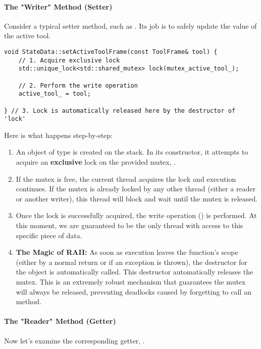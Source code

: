 \paragraph{The "Writer" Method (Setter)}
Consider a typical setter method, such as . Its job is to safely update the value of the active tool.

\begin{verbatim}
void StateData::setActiveToolFrame(const ToolFrame& tool) {
    // 1. Acquire exclusive lock
    std::unique_lock<std::shared_mutex> lock(mutex_active_tool_);
    
    // 2. Perform the write operation
    active_tool_ = tool;
    
} // 3. Lock is automatically released here by the destructor of 'lock'
\end{verbatim}
\label{lst:statedata-setter}

Here is what happens step-by-step:
\begin{enumerate}
    \item An object of type  is created on the stack. In its constructor, it attempts to acquire an \textbf{exclusive} lock on the provided mutex, .
    \item If the mutex is free, the current thread acquires the lock and execution continues. If the mutex is already locked by any other thread (either a reader or another writer), this thread will block and wait until the mutex is released.
    \item Once the lock is successfully acquired, the write operation () is performed. At this moment, we are guaranteed to be the only thread with access to this specific piece of data.
    \item \textbf{The Magic of RAII:} As soon as execution leaves the function's scope (either by a normal return or if an exception is thrown), the destructor for the  object is automatically called. This destructor automatically releases the mutex. This is an extremely robust mechanism that guarantees the mutex will always be released, preventing deadlocks caused by forgetting to call an  method.
\end{enumerate}

\paragraph{The "Reader" Method (Getter)}
Now let's examine the corresponding getter, .


